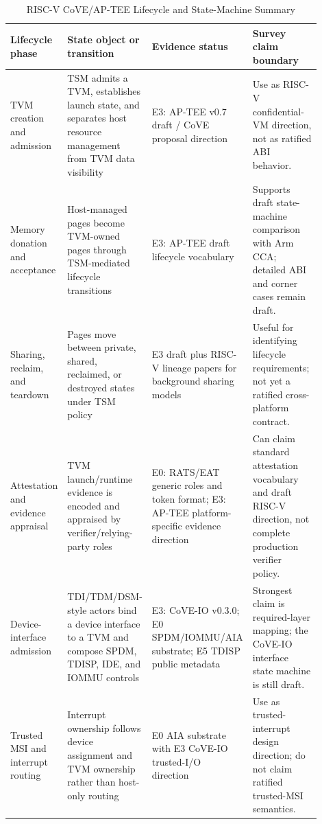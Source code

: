 \begin{table}[t]
\centering
\scriptsize
\caption{RISC-V CoVE/AP-TEE Lifecycle and State-Machine Summary}
\label{tab:riscv_lifecycle_summary}
\begin{tabular}{@{}p{0.17\linewidth}p{0.27\linewidth}p{0.23\linewidth}p{0.23\linewidth}@{}}
\toprule
\textbf{Lifecycle phase} & \textbf{State object or transition} & \textbf{Evidence status} & \textbf{Survey claim boundary} \\ \midrule
TVM creation and admission & TSM admits a TVM, establishes launch state, and separates host resource management from TVM data visibility & E3: AP-TEE v0.7 draft / CoVE proposal direction~\cite{riscv_ap_tee_2024,sahita2023cove} & Use as RISC-V confidential-VM direction, not as ratified ABI behavior. \\
Memory donation and acceptance & Host-managed pages become TVM-owned pages through TSM-mediated lifecycle transitions & E3: AP-TEE draft lifecycle vocabulary~\cite{riscv_ap_tee_2024} & Supports draft state-machine comparison with Arm CCA; detailed ABI and corner cases remain draft. \\
Sharing, reclaim, and teardown & Pages move between private, shared, reclaimed, or destroyed states under TSM policy & E3 draft plus RISC-V lineage papers for background sharing models~\cite{riscv_ap_tee_2024,lee2022cerberus} & Useful for identifying lifecycle requirements; not yet a ratified cross-platform contract. \\
Attestation and evidence appraisal & TVM launch/runtime evidence is encoded and appraised by verifier/relying-party roles & E0: RATS/EAT generic roles and token format; E3: AP-TEE platform-specific evidence direction~\cite{rats_rfc,eat_rfc,riscv_ap_tee_2024} & Can claim standard attestation vocabulary and draft RISC-V direction, not complete production verifier policy. \\
Device-interface admission & TDI/TDM/DSM-style actors bind a device interface to a TVM and compose SPDM, TDISP, IDE, and IOMMU controls & E3: CoVE-IO v0.3.0; E0 SPDM/IOMMU/AIA substrate; E5 TDISP public metadata~\cite{riscv_cove_io_2026,dmtf_spdm_2025,riscv_iommu_2023,riscv_aia_2023,pcisig_tdisp_2022} & Strongest claim is required-layer mapping; the CoVE-IO interface state machine is still draft. \\
Trusted MSI and interrupt routing & Interrupt ownership follows device assignment and TVM ownership rather than host-only routing & E0 AIA substrate with E3 CoVE-IO trusted-I/O direction~\cite{riscv_aia_2023,riscv_cove_io_2026} & Use as trusted-interrupt design direction; do not claim ratified trusted-MSI semantics. \\ \bottomrule
\end{tabular}
\end{table}


